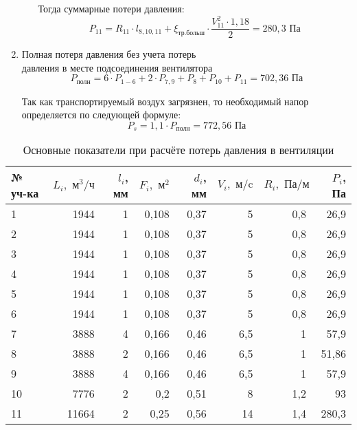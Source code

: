 \begin{enumerate}
\begin{itemize}
                    Тогда суммарные потери давления:
                    $$
                        P_{11} = R_{11} \cdot l_{8,10,11}
                                    + \xi_\text{тр.больш} \cdot \frac{V_{11}^2 \cdot 1,18}{2}
                                = 280,3 \text{ Па}
                    $$
        \end{itemize}

        \item   Полная потеря давления без учета потерь \\ давления в месте
                подсоединения вентилятора
                $$
                    P_\text{полн} = 6 \cdot P_{1-6} + 2 \cdot P_{7,9} + P_{8} + P_{10} + P_{11}
                                = 702,36 \text{ Па}
                $$

                Так как транспортируемый воздух загрязнен, то необходимый напор
                определяется по следующей формуле:
                $$
                    P_s = 1,1 \cdot P_\text{полн} = 772,56 \text{ Па}
                $$
\end{enumerate}

\begin{table}[ht]
    \centering
    \begin{tabular}{l|r|r|r|r|r|r|r}
        № уч-ка & $L_i, \text{ м}^3/\text{ч}$  & $\textit{l}_i$, мм & $F_i, \text{ м}^2$
        & $d_i$, мм & $V_i, \text{ м/c}$ & $R_i, \text{ Па/м}$ & $P_i$, Па              \\ \hline
        1   & 1944  & 1 & 0,108 & 0,37  & 5     & 0,8   & 26,9                          \\
        2   & 1944  & 1 & 0,108 & 0,37  & 5     & 0,8   & 26,9                          \\
        3   & 1944  & 1 & 0,108 & 0,37  & 5     & 0,8   & 26,9                          \\
        4   & 1944  & 1 & 0,108 & 0,37  & 5     & 0,8   & 26,9                          \\
        5   & 1944  & 1 & 0,108 & 0,37  & 5     & 0,8   & 26,9                          \\
        6   & 1944  & 1 & 0,108 & 0,37  & 5     & 0,8   & 26,9                          \\
        7   & 3888  & 4 & 0,166 & 0,46  & 6,5   & 1     & 57,9                          \\
        8   & 3888  & 2 & 0,166 & 0,46  & 6,5   & 1     & 51,86                         \\
        9   & 3888  & 4 & 0,166 & 0,46  & 6,5   & 1     & 57,9                          \\
        10  & 7776  & 2 & 0,2   & 0,51  & 8     & 1,2   & 93                            \\
        11  & 11664 & 2 & 0,25  & 0,56  & 14    & 1,4   & 280,3                         \\

    \end{tabular}
    \caption{Основные показатели при расчёте потерь давления в вентиляции}
    \label{pressure_drop_calc_parameters}
\end{table}
